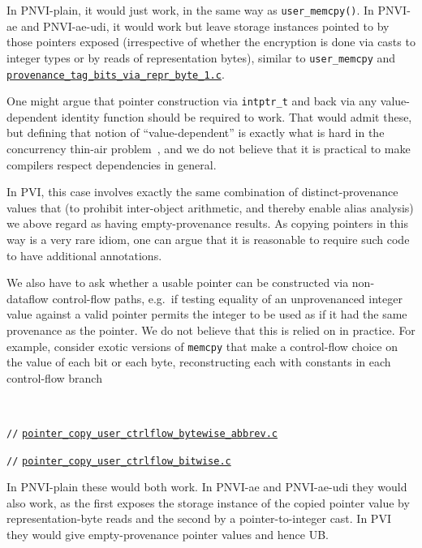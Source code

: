 \documentclass[acmsmall,review,screen]{acmart}\settopmatter{printfolios=true,printccs=false,printacmref=false}
\newcommand{\myparagraph}[1]{\vspace{0.5\baselineskip}\par\noindent{\normalsize\bfseries{#1}}\quad}
\newcommand{\mytesturl}[1]{https://cerberus.cl.cam.ac.uk/cerberus?defacto/#1}
\newcommand{\mytestlink}[2]{\href{\mytesturl{#1}}{#2}}
\newcommand{\mylsttestlink}[1]{\mytestlink{#1}{\lstinline{#1}}}
\newcommand{\mylistingmargin}{5mm}
\newcommand{\myfooexamplename}[1]{\mylsttestlink{#1}}
\newcommand{\myfooexample}[3]{{\vspace*{-0.5\baselineskip}\par{\noindent\small\hspace*{\mylistingmargin}\lstinline{//} \mylsttestlink{#2}\vspace*{0.25\baselineskip}\par}}}
\begin{document}
In PNVI-plain, it would just work, in the same way as \lstinline{user_memcpy()}.
In PNVI-ae and PNVI-ae-udi, it would work but leave storage instances
pointed to by those pointers exposed  (irrespective of whether the
encryption
is done via casts to integer types or by reads of representation
bytes), 
similar to \lstinline{user_memcpy} and \myfooexamplename{provenance_tag_bits_via_repr_byte_1.c}. 
%
%

One might argue that pointer construction via \lstinline{intptr_t} and back via any
value-dependent identity function should be required to work.  That
would admit these, but defining that notion of ``value-dependent'' is
exactly what is hard in the concurrency thin-air problem~\cite{BMNPS2015},
and we do not believe that it is practical to make compilers respect dependencies in general.

In PVI, this case involves exactly the same combination of distinct-provenance
values that (to prohibit inter-object arithmetic, and thereby enable
alias analysis) we above regard as having empty-provenance results.  
As copying pointers in this way  is a very rare idiom, one can argue
that  it is reasonable to require such
code to have additional annotations.

\newpage

\myparagraph{Copying pointer values via control flow} 
We
also have to ask whether a usable pointer can be constructed via
non-dataflow control-flow paths, e.g.~if testing
equality of an unprovenanced integer value against a valid pointer
permits the integer to be used as if it had the same provenance as the
pointer.  We do not believe that this is relied on in practice.
 For example, consider
exotic versions of
\lstinline{memcpy}
that make a control-flow choice on the
value of each bit or each byte, reconstructing each with constants in
each control-flow branch

\

\begin{center}
  \begin{minipage}[t]{0.49\textwidth}
{\renewcommand{\mylistingmargin}{0mm}\myfooexample{charon_tests}{pointer_copy_user_ctrlflow_bytewise_abbrev.c}{}%
}
\vspace*{-0\baselineskip}
\end{minipage}
  \begin{minipage}[t]{0.49\textwidth}
    {\renewcommand{\mylistingmargin}{0mm}\myfooexample{charon_tests}{pointer_copy_user_ctrlflow_bitwise.c}{}%
}
  \end{minipage}
  \end{center}
In PNVI-plain these would both work. In PNVI-ae and PNVI-ae-udi
they would also work, as the first exposes the storage instance of the
copied pointer value by  representation-byte reads and the second by
a pointer-to-integer cast. In PVI they would give
empty-provenance pointer values and hence UB.
\end{document}
